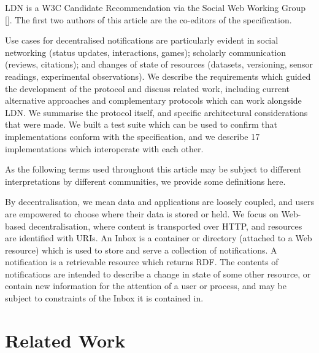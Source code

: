                             
\par LDN is a W3C \empty Candidate Recommendation via the \empty Social Web Working Group []. The first two authors of this article are the co-editors of the specification.

                            
\par Use cases for decentralised notifications are particularly evident in social networking (status updates, interactions, games); scholarly communication (reviews, citations); and changes of state of resources (datasets, versioning, sensor readings, experimental observations). We describe the requirements which guided the development of the protocol and discuss related work, including current alternative approaches and complementary protocols which can work alongside LDN. We summarise the protocol itself, and specific architectural considerations that were made. We built a test suite which can be used to confirm that implementations conform with the specification, and we describe 17 implementations which interoperate with each other.

                            
                                
\par As the following terms used throughout this article may be subject to different interpretations by different communities, we provide some definitions here.

                                
\par By decentralisation, we mean data and applications are loosely coupled, and users are empowered to choose where their data is stored or held. We focus on Web-based decentralisation, where content is transported over HTTP, and resources are identified with URIs. An Inbox is a container or directory (attached to a Web resource) which is used to store and serve a collection of notifications. A notification is a retrievable resource which returns RDF. The contents of notifications are intended to describe a change in state of some other resource, or contain new information for the attention of a user or process, and may be subject to constraints of the Inbox it is contained in.
                                
                            

                            
                        
                    

                    
                        \section{Related Work}
  \label{related-work}

